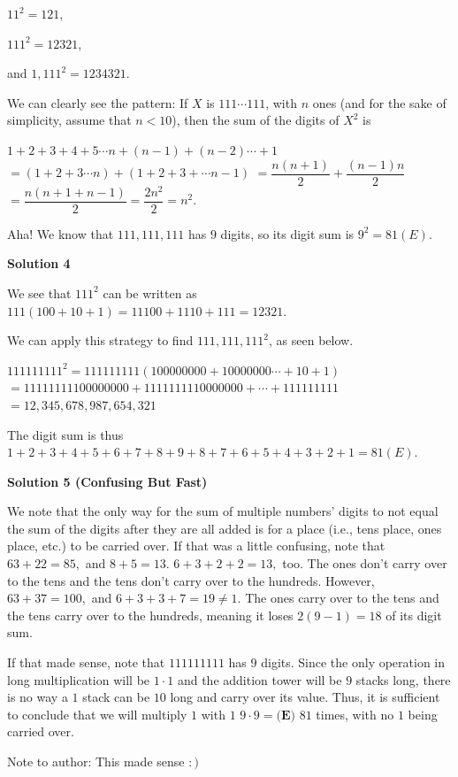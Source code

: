 \begin{enumerate}
 $11^2 = 121$,

 $111^2 = 12321$,

 and $1,111^2 = 1234321$.

 We can clearly see the pattern: If $X$ is $111\cdots111$, with $n$ ones (and for the sake of simplicity, assume that $n<10$), then the sum of the digits of $X^2$ is 

 $1+2+3+4+5\cdots n+(n-1)+(n-2)\cdots+1$
$=(1+2+3\cdots n)+(1+2+3+\cdots n-1)$
$=\dfrac{n(n+1)}{2}+\dfrac{(n-1)n}{2}$
$=\dfrac{n(n+1+n-1)}{2}=\dfrac{2n^2}{2}=n^2.$

 Aha! We know that $111,111,111$ has $9$ digits, so its digit sum is $9^2=\boxed{81(E)}$.

 



\textbf{Solution 4}

We see that $111^2$ can be written as $111(100+10+1)=11100+1110+111=12321$.

 We can apply this strategy to find $111,111,111^2$, as seen below.

 $111111111^2=111111111(100000000+10000000\cdots+10+1)$
$=11111111100000000+1111111110000000+\cdots+111111111$
$=12,345,678,987,654,321$ 

 The digit sum is thus $1+2+3+4+5+6+7+8+9+8+7+6+5+4+3+2+1=81 \boxed{(E)}$.

 



\textbf{Solution 5 (Confusing But Fast)}

We note that the only way for the sum of multiple numbers' digits to not equal the sum of the digits after they are all added is for a place (i.e., tens place, ones place, etc.) to be carried over. If that was a little confusing, note that $63+22=85,$ and $8+5=13.$ $6+3+2+2=13,$ too. The ones don't carry over to the tens and the tens don't carry over to the hundreds. However, $63+37=100,$ and $6+3+3+7=19 \neq 1.$ The ones carry over to the tens and the tens carry over to the hundreds, meaning it loses $2(9-1)=18$ of its digit sum.

 
If that made sense, note that $111111111$ has $9$ digits. Since the only operation in long multiplication will be $1 \cdot 1$ and the addition tower will be $9$ stacks long, there is no way a $1$ stack can be $10$ long and carry over its value. Thus, it is sufficient to conclude that we will multiply $1$ with $1$ $9 \cdot 9= \boxed{\textbf{(E) }81}$ times, with no $1$ being carried over.

 Note to author: This made sense $:)$





\end{enumerate}
